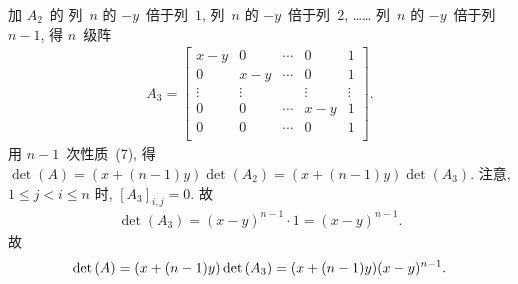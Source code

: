 \documentclass[../libro.tex]{subfiles}
\begin{document}
\begin{example}
    加 \(A_2\)~的%
    列~\(n\) 的 \(-y\)~倍于列~\(1\),
    列~\(n\) 的 \(-y\)~倍于列~\(2\),
    ……
    列~\(n\) 的 \(-y\)~倍于列~\(n-1\),
    得 \(n\)~级阵
    \begin{align*}
        A_3 =
        \begin{bmatrix}
            x-y    & 0      & \cdots & 0      & 1      \\
            0      & x-y    & \cdots & 0      & 1      \\
            \vdots & \vdots & {}     & \vdots & \vdots \\
            0      & 0      & \cdots & x-y    & 1      \\
            0      & 0      & \cdots & 0      & 1      \\
        \end{bmatrix}.
    \end{align*}
    用 \(n-1\)~次性质~(7), 得
    \(\det {(A)}
        = (x + (n-1)y) \det {(A_2)}
    = (x + (n-1)y) \det {(A_3)}\).
    注意,
    \(1 \leq j < i \leq n\) 时,
    \([A_3]_{i,j} = 0\).
    故
    \begin{align*}
        \det {(A_3)} = (x-y)^{n-1} \cdot 1 = (x-y)^{n-1}.
    \end{align*}
    故
    \begin{equation*}
        \det {(A)}
        = (x + (n-1)y) \det {(A_3)}
        = (x + (n-1)y) (x-y)^{n-1}.
        \qedhere
    \end{equation*}
\end{example}
\end{document}
